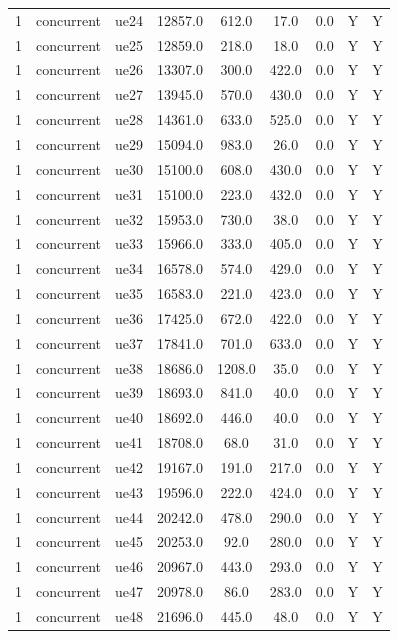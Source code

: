 \begin{table}[ht]
\begin{tabular}{|c|c|c|c|c|c|c|c|c|}
1 & concurrent & ue24 & 12857.0 & 612.0 & 17.0 & 0.0 & Y & Y \\
1 & concurrent & ue25 & 12859.0 & 218.0 & 18.0 & 0.0 & Y & Y \\
1 & concurrent & ue26 & 13307.0 & 300.0 & 422.0 & 0.0 & Y & Y \\
1 & concurrent & ue27 & 13945.0 & 570.0 & 430.0 & 0.0 & Y & Y \\
1 & concurrent & ue28 & 14361.0 & 633.0 & 525.0 & 0.0 & Y & Y \\
1 & concurrent & ue29 & 15094.0 & 983.0 & 26.0 & 0.0 & Y & Y \\
1 & concurrent & ue30 & 15100.0 & 608.0 & 430.0 & 0.0 & Y & Y \\
1 & concurrent & ue31 & 15100.0 & 223.0 & 432.0 & 0.0 & Y & Y \\
1 & concurrent & ue32 & 15953.0 & 730.0 & 38.0 & 0.0 & Y & Y \\
1 & concurrent & ue33 & 15966.0 & 333.0 & 405.0 & 0.0 & Y & Y \\
1 & concurrent & ue34 & 16578.0 & 574.0 & 429.0 & 0.0 & Y & Y \\
1 & concurrent & ue35 & 16583.0 & 221.0 & 423.0 & 0.0 & Y & Y \\
1 & concurrent & ue36 & 17425.0 & 672.0 & 422.0 & 0.0 & Y & Y \\
1 & concurrent & ue37 & 17841.0 & 701.0 & 633.0 & 0.0 & Y & Y \\
1 & concurrent & ue38 & 18686.0 & 1208.0 & 35.0 & 0.0 & Y & Y \\
1 & concurrent & ue39 & 18693.0 & 841.0 & 40.0 & 0.0 & Y & Y \\
1 & concurrent & ue40 & 18692.0 & 446.0 & 40.0 & 0.0 & Y & Y \\
1 & concurrent & ue41 & 18708.0 & 68.0 & 31.0 & 0.0 & Y & Y \\
1 & concurrent & ue42 & 19167.0 & 191.0 & 217.0 & 0.0 & Y & Y \\
1 & concurrent & ue43 & 19596.0 & 222.0 & 424.0 & 0.0 & Y & Y \\
1 & concurrent & ue44 & 20242.0 & 478.0 & 290.0 & 0.0 & Y & Y \\
1 & concurrent & ue45 & 20253.0 & 92.0 & 280.0 & 0.0 & Y & Y \\
1 & concurrent & ue46 & 20967.0 & 443.0 & 293.0 & 0.0 & Y & Y \\
1 & concurrent & ue47 & 20978.0 & 86.0 & 283.0 & 0.0 & Y & Y \\
1 & concurrent & ue48 & 21696.0 & 445.0 & 48.0 & 0.0 & Y & Y \\

\end{tabular}
\end{table}
